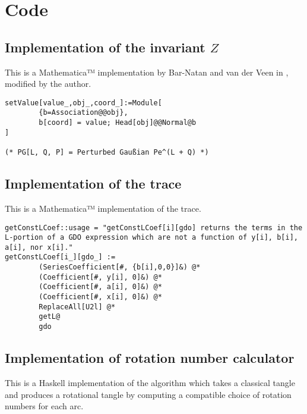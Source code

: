 \chapter{Code}
\section{Implementation of the invariant $Z$}
This is a Mathematica™ implementation by Bar-Natan and van der Veen in
\cite{BV}, modified by the author.
\begin{verbatim}
setValue[value_,obj_,coord_]:=Module[
        {b=Association@@obj},
        b[coord] = value; Head[obj]@@Normal@b
]

(* PG[L, Q, P] = Perturbed Gaußian Pe^(L + Q) *)
\end{verbatim}

\section{Implementation of the trace}

This is a Mathematica™ implementation of the trace.
\begin{verbatim}
getConstLCoef::usage = "getConstLCoef[i][gdo] returns the terms in the L-portion of a GDO expression which are not a function of y[i], b[i], a[i], nor x[i]."
getConstLCoef[i_][gdo_] :=
        (SeriesCoefficient[#, {b[i],0,0}]&) @*
        (Coefficient[#, y[i], 0]&) @*
        (Coefficient[#, a[i], 0]&) @*
        (Coefficient[#, x[i], 0]&) @*
        ReplaceAll[U2l] @*
        getL@
        gdo
\end{verbatim}

\section{Implementation of rotation number calculator}

This is a Haskell implementation of the algorithm  which takes a
classical tangle and produces a rotational tangle by computing a compatible
choice of rotation numbers for each arc.


